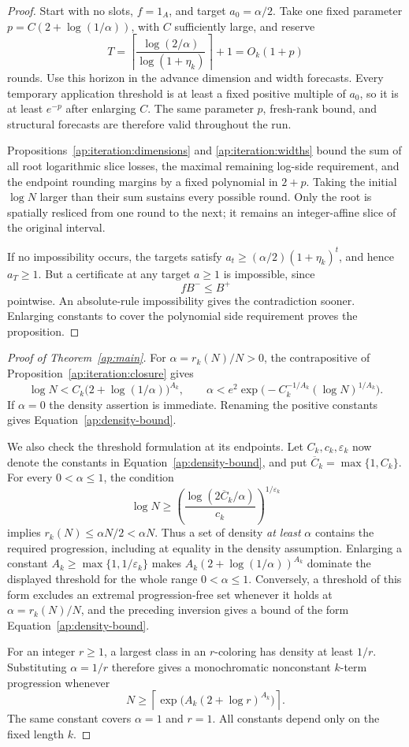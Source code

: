 \begin{proof}
Start with no slots, $f=1_A$, and target $a_0=\alpha/2$.
Take one fixed parameter
$p=C(2+\log(1/\alpha))$, with $C$ sufficiently large, and reserve
\[
 T=\left\lceil\frac{\log(2/\alpha)}{\log(1+\eta_k)}\right\rceil+1
       =O_k(1+p)
\]
rounds.  Use this horizon in the advance dimension and width forecasts.
Every temporary application threshold is at least a fixed positive
multiple of $a_0$, so it is at least $e^{-p}$ after enlarging $C$.
The same parameter $p$, fresh-rank bound, and structural forecasts are
therefore valid throughout the run.

Propositions~\ref{ap:iteration:dimensions} and
\ref{ap:iteration:widths} bound the sum of all root logarithmic slice
losses, the maximal remaining log-side requirement, and the endpoint
rounding margins by a fixed polynomial in $2+p$.  Taking the initial
$\log N$ larger than their sum sustains every possible round.  Only
the root is spatially resliced from one round to the next; it remains
an integer-affine slice of the original interval.

If no impossibility occurs, the targets satisfy
$a_t\ge(\alpha/2)(1+\eta_k)^t$, and hence $a_T\ge1$.
But a certificate at any target $a\ge1$ is impossible, since
\[
                         fB^-\le B^+
\]
pointwise.  An absolute-rule impossibility gives the contradiction
sooner.  Enlarging constants to cover the polynomial side requirement
proves the proposition.
\end{proof}

\begin{proof}[Proof of Theorem~\ref{ap:main}]
For $\alpha=r_k(N)/N>0$, the contrapositive of
Proposition~\ref{ap:iteration:closure} gives
\[
 \log N<C_k\bigl(2+\log(1/\alpha)\bigr)^{A_k},
 \qquad
 \alpha<e^2\exp\bigl(-C_k^{-1/A_k}(\log N)^{1/A_k}\bigr).
\]
If $\alpha=0$ the density assertion is immediate.  Renaming the
positive constants gives Equation~\eqref{ap:density-bound}.

We also check the threshold formulation at its endpoints.  Let
$C_k,c_k,\varepsilon_k$ now denote the constants in
Equation~\eqref{ap:density-bound}, and put
$\overline C_k=\max\{1,C_k\}$.  For every $0<\alpha\le1$, the
condition
\[
 \log N\ge
 \left(\frac{\log(2\overline C_k/\alpha)}{c_k}\right)^{1/\varepsilon_k}
\]
implies $r_k(N)\le\alpha N/2<\alpha N$.  Thus a set of density
\emph{at least} $\alpha$ contains the required progression, including
at equality in the density assumption.  Enlarging a constant
$A_k\ge\max\{1,1/\varepsilon_k\}$ makes
$A_k(2+\log(1/\alpha))^{A_k}$ dominate the displayed threshold
for the whole range $0<\alpha\le1$.  Conversely, a threshold of
this form excludes an extremal progression-free set whenever it
holds at $\alpha=r_k(N)/N$, and the preceding inversion gives a
bound of the form Equation~\eqref{ap:density-bound}.

For an integer $r\ge1$, a largest class in an $r$-coloring has
density at least $1/r$.  Substituting $\alpha=1/r$ therefore gives
a monochromatic nonconstant $k$-term progression whenever
\[
 N\ge\left\lceil\exp\bigl(A_k(2+\log r)^{A_k}\bigr)\right\rceil.
\]
The same constant covers $\alpha=1$ and $r=1$.  All constants
depend only on the fixed length $k$.
\end{proof}
